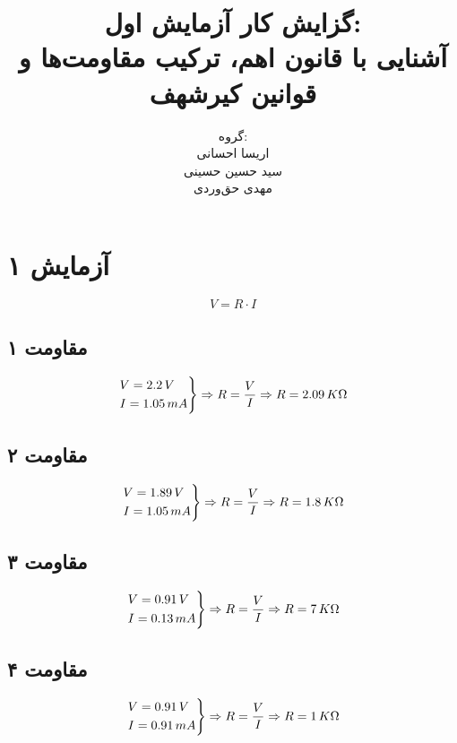 \documentclass{article}
\title{گزایش کار آزمایش اول:\\آشنایی با قانون اهم، ترکیب مقاومت‌ها و قوانین کیرشهف}
\author{
	گروه: \\
	اریسا احسانی \\
	سید حسین حسینی \\
	مهدی حق‌وردی
}
\date{}
\begin{document}
	\maketitle
	\tableofcontents
	\clearpage
	
	\section{آزمایش ۱}
		\begin{equation}
			V = R \cdot I
		\end{equation}
		
		\subsection{مقاومت ۱}		
		    \begin{equation*}
		    	\begin{rcases}
		    		V = 2.2 \, V  \\	
		    		I = 1.05 \, mA
		    	\end{rcases}
	    		\Rightarrow R = \frac{V}{I} \Rightarrow R = 2.09 \, K \Omega
		    \end{equation*}
		\subsection{مقاومت ۲}
		    \begin{equation*}
				\begin{rcases}
					V = 1.89 \, V  \\	
					I = 1.05 \, mA
				\end{rcases}
				\Rightarrow R = \frac{V}{I} \Rightarrow R = 1.8 \, K \Omega
			\end{equation*}
			
		\subsection{مقاومت ۳}
		   \begin{equation*}
				\begin{rcases}
					V = 0.91 \, V  \\	
					I = 0.13 \, mA
				\end{rcases}
				\Rightarrow R = \frac{V}{I} \Rightarrow R = 7 \, K \Omega
			\end{equation*}
		
		\subsection{مقاومت ۴}
		     \begin{equation*}
		 	 \begin{rcases}
		 	    V = 0.91 \, V  \\	
		 		I = 0.91 \, mA
		 	\end{rcases}
		 	\Rightarrow R = \frac{V}{I} \Rightarrow R = 1 \, K \Omega
		 \end{equation*}
		 
\end{document}
